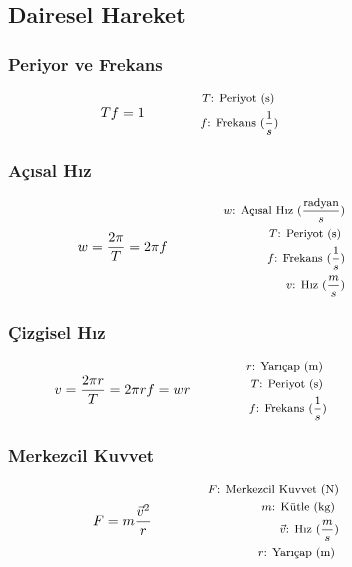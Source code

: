 \subsection{Dairesel Hareket}

\subsubsection*{Periyor ve Frekans}
\begin{equation}
    Tf = 1 \qquad \qquad \parbox{5.5cm}{\footnotesize$\begin{aligned}
        T\text{: Periyot (s) } \\
        f\text{: Frekans } (\frac{1}{s})
\end{aligned}$}
\end{equation}

\subsubsection*{Açısal Hız}
\begin{equation}
    w  = \frac{2\pi}{T} = 2 \pi f \qquad \qquad \parbox{5.5cm}{\footnotesize$\begin{aligned}
        w\text{: Açısal Hız } (\frac{\text{radyan}}{s}) \\
        T\text{: Periyot (s) } \\
        f\text{: Frekans } (\frac{1}{s}) \\
        v\text{: Hız } (\frac{m}{s})
\end{aligned}$}
\end{equation}

\subsubsection*{Çizgisel Hız}
\begin{equation}
    v = \frac{2 \pi r}{T} = 2 \pi r f = w r  \qquad \qquad \parbox{5.5cm}{\footnotesize$\begin{aligned}
        r\text{: Yarıçap (m) } \\
        T\text{: Periyot (s) } \\
        f\text{: Frekans } (\frac{1}{s})
\end{aligned}$}
\end{equation}

\subsubsection*{Merkezcil Kuvvet}
\begin{equation}
    F = m \frac{\vec{v}^2}{r} \qquad \qquad \parbox{5.5cm}{\footnotesize$\begin{aligned}
        F\text{: Merkezcil Kuvvet (N)} \\
        m\text{: Kütle (kg) } \\
        \vec{v}\text{: Hız } (\frac{m}{s}) \\
        r\text{: Yarıçap (m) }
\end{aligned}$}
\end{equation}

